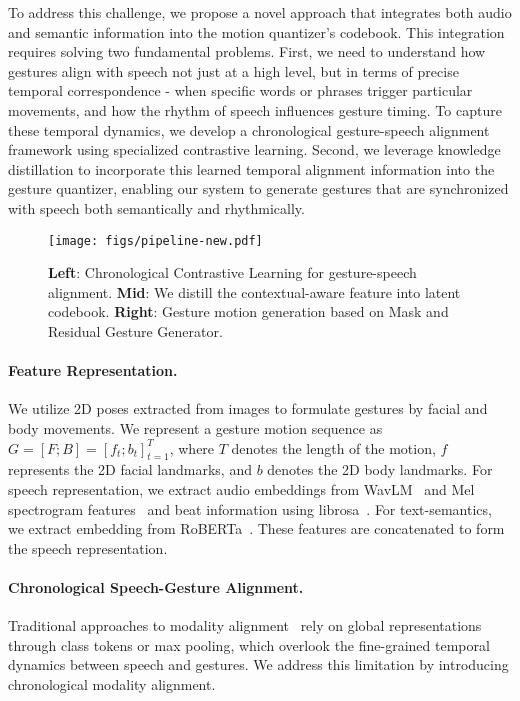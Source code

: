 To address this challenge, we propose a novel approach that integrates both audio and semantic information into the motion quantizer's codebook. This integration requires solving two fundamental problems. First, we need to understand how gestures align with speech not just at a high level, but in terms of precise temporal correspondence - when specific words or phrases trigger particular movements, and how the rhythm of speech influences gesture timing. To capture these temporal dynamics, we develop a chronological gesture-speech alignment framework using specialized contrastive learning. Second, we leverage knowledge distillation to incorporate this learned temporal alignment information into the gesture quantizer, enabling our system to generate gestures that are synchronized with speech both semantically and rhythmically.

\begin{figure*}[t!]
	\centering
         \vspace{-0.15in}
	\texttt{[image: figs/pipeline-new.pdf]}
	\vspace{-7mm}
	\caption{\textbf{Left}: Chronological Contrastive Learning for gesture-speech alignment. \textbf{Mid}: We distill the contextual-aware feature into latent codebook. \textbf{Right}: Gesture motion generation based on Mask and Residual Gesture Generator.}
	\label{fig:motion}
	\vspace{-5mm}
\end{figure*}

\vspace{-0.2cm}
\paragraph{Feature Representation.} We utilize 2D poses extracted from images to formulate gestures by facial and body movements. We represent a gesture motion sequence as \( G = [F; B] = [f_t; b_t]_{t=1}^{T} \), where \( T \) denotes the length of the motion, \( f \) represents the 2D facial landmarks, and \( b \) denotes the 2D body landmarks. For speech representation, we extract audio embeddings from WavLM~\cite{chen2022wavlm} and Mel spectrogram features~\cite{rabiner2010theory} and beat information using librosa~\cite{mcfee2015librosa}. For text-semantics, we extract embedding from RoBERTa~\cite{roberta}. These features are concatenated to form the speech representation. 

\vspace{-0.2cm}
\paragraph{Chronological Speech-Gesture Alignment.}
\label{sec:contrastive}
Traditional approaches to modality alignment~\cite{ao2022rhythmic, liu2022learning, Deichler_2023} rely on global representations through class tokens or max pooling, which overlook the fine-grained temporal dynamics between speech and gestures. We address this limitation by introducing chronological modality alignment.

